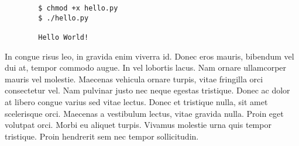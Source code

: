 \documentclass{article}
\begin{document}
\begin{commandline}
	\begin{verbatim}
		$ chmod +x hello.py
		$ ./hello.py

		Hello World!
	\end{verbatim}
\end{commandline}


\begin{warn}[Notice:]
  In congue risus leo, in gravida enim viverra id. Donec eros mauris, bibendum vel dui at, tempor commodo augue. In vel lobortis lacus. Nam ornare ullamcorper mauris vel molestie. Maecenas vehicula ornare turpis, vitae fringilla orci consectetur vel. Nam pulvinar justo nec neque egestas tristique. Donec ac dolor at libero congue varius sed vitae lectus. Donec et tristique nulla, sit amet scelerisque orci. Maecenas a vestibulum lectus, vitae gravida nulla. Proin eget volutpat orci. Morbi eu aliquet turpis. Vivamus molestie urna quis tempor tristique. Proin hendrerit sem nec tempor sollicitudin.
\end{warn}
\end{document}
